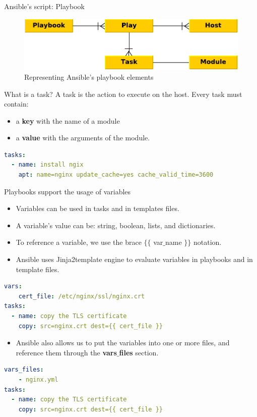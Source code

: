 \documentclass[xcolor=dvipsnames,slidestop, mathserif]{beamer}
\begin{document}
\begin{frame}[fragile]{Ansible's script: Playbook}
\vspace{-0.5cm}
  \begin{figure}
     \centering
     \includegraphics[width=.4\columnwidth]{playbook}
     \caption{Representing Ansible's playbook elements}
  \end{figure}
\vspace{-0.5cm}
  \begin{block}{What is a task?}
     A task is the action to execute on the host. Every task must contain:
     \begin{itemize}
        \item a \textbf{key} with the name of a module
        \item a \textbf{value} with the arguments of the module.
     \end{itemize}
     \begin{lstlisting}[language=yaml,basicstyle=\ttfamily\scriptsize,
showspaces=false,showstringspaces=false,frame=tb]
tasks:
  - name: install ngix
    apt: name=nginx update_cache=yes cache_valid_time=3600
     \end{lstlisting}
  \end{block}
\end{frame}

\begin{frame}[fragile]{Playbooks support the usage of variables}
\begin{itemize}
  \item Variables can be used in tasks and in templates files.
  \item A variable's value can be: string, boolean, lists, and dictionaries.
  \item To reference a variable, we use the brace $\{\{$ var$\_$name $\}\}$ notation.
  \item Ansible uses Jinja2\footnotemark template engine to evaluate variables in playbooks and in template files.
\end{itemize}
\begin{lstlisting}[language=yaml,frame=tb,caption={Example of defining and referencing a variable}]
vars:
    cert_file: /etc/nginx/ssl/nginx.crt
tasks:
  - name: copy the TLS certificate
    copy: src=nginx.crt dest={{ cert_file }}
\end{lstlisting}

\begin{itemize}
  \item Ansible also allows us to put the variables into one or more files, and reference them through the \textbf{vars$\_$files} section.
\end{itemize}
\begin{lstlisting}[language=yaml,frame=tb,caption={Example of defining the variables in separate files}]
vars_files:
    - nginx.yml
tasks:
  - name: copy the TLS certificate
    copy: src=nginx.crt dest={{ cert_file }}
\end{lstlisting}
\end{frame}
\end{document}
